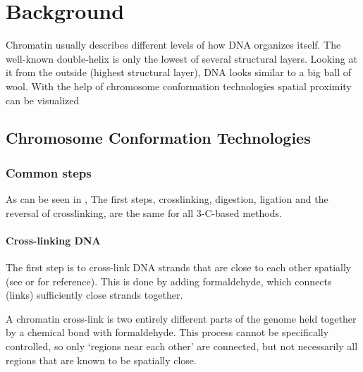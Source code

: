\chapter{Background}\label{chap:background}







Chromatin usually describes different levels of how DNA organizes itself. The
well-known double-helix is only the lowest of several structural layers.
Looking at it from the outside (highest structural layer), DNA looks similar to
a big ball of wool. With the help of chromosome conformation technologies
spatial proximity can be visualized


\section{Chromosome Conformation Technologies}\label{sec:3c}\label{sec:hic}



\subsection{Common steps}\label{sec:common}

As can be seen in , The first steps, crosslinking, digestion,
ligation and the reversal of crosslinking, are the same for all 3-C-based methods.

\subsubsection{Cross-linking DNA}\label{sec:crosslinking}

The first step is to cross-link DNA strands that are close to each other
spatially (see  or  for reference). This is done by adding
formaldehyde, which connects (links) sufficiently close strands together.

A chromatin cross-link is two entirely different parts of the genome held
together by a chemical bond with formaldehyde. This process cannot be
specifically controlled, so only `regions near each other' are connected, but
not necessarily all regions that are known to be spatially close.

